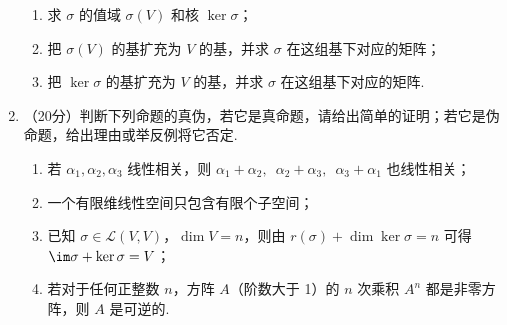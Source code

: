 \begin{enumerate}
\begin{enumerate}
        \item 求 $\sigma$ 的值域 $\sigma(V)$ 和核 $\ker \sigma$；

        \item 把 $\sigma(V)$ 的基扩充为 $V$ 的基，并求 $\sigma$ 在这组基下对应的矩阵；

        \item 把 $\ker \sigma$ 的基扩充为 $V$ 的基，并求 $\sigma$ 在这组基下对应的矩阵.
    \end{enumerate}
	\item （20分）判断下列命题的真伪，若它是真命题，请给出简单的证明；若它是伪命题，给出理由或举反例将它否定.
    \begin{enumerate}
        \item 若 $\alpha_1,\alpha_2,\alpha_3$ 线性相关，则 $\alpha_1+\alpha_2,\enspace \alpha_2+\alpha_3,\enspace \alpha_3+\alpha_1$ 也线性相关；

        \item 一个有限维线性空间只包含有限个子空间；

        \item 已知 $\sigma \in \mathcal{L}(V,V)$，$\dim V=n$，则由 $r(\sigma)+\dim\ker\sigma=n$ 可得$\im \sigma+\ker \sigma=V$；

        \item 若对于任何正整数 $n$，方阵 $A$（阶数大于 1）的 $n$ 次乘积 $A^n$ 都是非零方阵，则 $A$ 是可逆的.
    \end{enumerate}
\end{enumerate}

\clearpage
